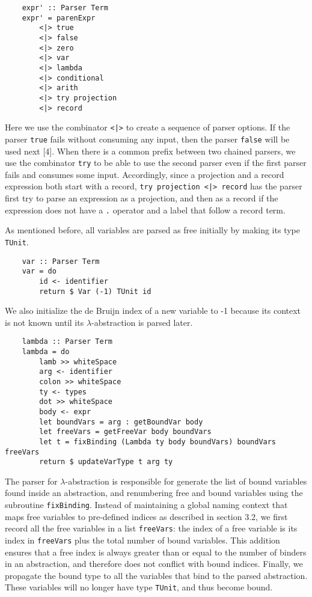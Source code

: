 \documentclass[fleqn, 11pt]{article}
\begin{document}
\begin{Verbatim}    
    expr' :: Parser Term
    expr' = parenExpr
        <|> true
        <|> false
        <|> zero
        <|> var
        <|> lambda
        <|> conditional
        <|> arith
        <|> try projection 
        <|> record
\end{Verbatim}

Here we use the combinator \texttt{<|>} to create a sequence of parser options. If the parser \texttt{true} fails without consuming 
any input, then the parser \texttt{false} will be used next [4]. When there is a common prefix between two chained parsers, we use 
the combinator \texttt{try} to be able to use the second parser even if the first parser fails and consumes some input. Accordingly, 
since a projection and a record expression both start with a record, \texttt{try projection <|> record} has the parser first try to parse 
an expression as a projection, and then as a record if the expression does not have a \texttt{.} operator and a label that follow a record 
term.

As mentioned before, all variables are parsed as free initially by making its type \texttt{TUnit}.

\begin{Verbatim}
    var :: Parser Term
    var = do
        id <- identifier
        return $ Var (-1) TUnit id          
\end{Verbatim}

We also initialize the de Bruijn index of a new variable to -1 because its context is not known until its $\lambda$-abstraction 
is parsed later.

\begin{Verbatim}
    lambda :: Parser Term
    lambda = do 
        lamb >> whiteSpace
        arg <- identifier 
        colon >> whiteSpace
        ty <- types
        dot >> whiteSpace
        body <- expr
        let boundVars = arg : getBoundVar body
        let freeVars = getFreeVar body boundVars 
        let t = fixBinding (Lambda ty body boundVars) boundVars freeVars
        return $ updateVarType t arg ty         
\end{Verbatim}

The parser for $\lambda$-abstraction is responsible for generate the list of bound variables found inside an abstraction,
and renumbering free and bound variables using the subroutine \texttt{fixBinding}. Instead of maintaining a 
global naming context that maps free variables to pre-defined indices as described in section 3.2, we first record 
all the free variables in a list \texttt{freeVars}: the index of a free variable is its index in \texttt{freeVars} plus 
the total number of bound variables. This addition ensures that a free index is always greater than or equal to 
the number of binders in an abstraction, and therefore does not conflict with bound indices. Finally, we propagate the bound 
type to all the variables that bind to the parsed abstraction. These variables will no longer have type \texttt{TUnit}, and 
thus become bound.
\end{document}
